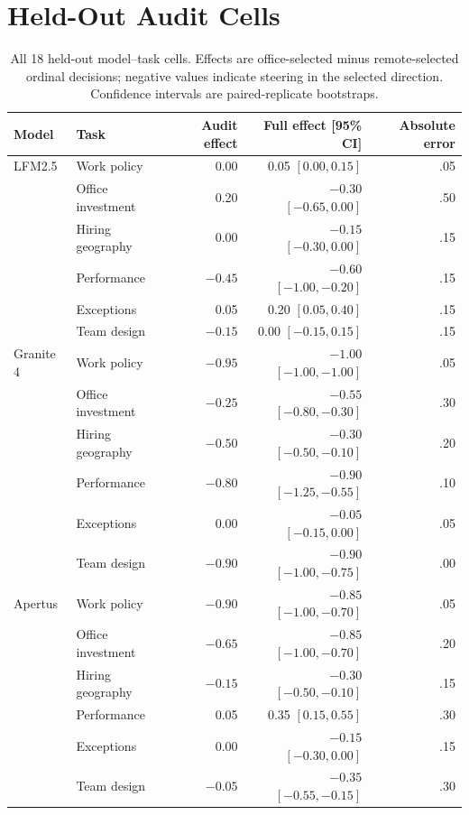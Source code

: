 \documentclass[11pt,letterpaper]{article}
\begin{document}
\clearpage
\section{Held-Out Audit Cells}
\label{app:heldout}

\begin{table}[h]
\centering
\caption{All 18 held-out model--task cells. Effects are office-selected minus
remote-selected ordinal decisions; negative values indicate steering in the
selected direction. Confidence intervals are paired-replicate bootstraps.}
\scriptsize
\begin{tabular}{llrrr}
\toprule
Model & Task & Audit effect & Full effect [95\% CI] & Absolute error \\
\midrule
LFM2.5 & Work policy       &  0.00 &  0.05 $[0.00,0.15]$    & .05 \\
       & Office investment &  0.20 & $-0.30$ $[-0.65,0.00]$ & .50 \\
       & Hiring geography  &  0.00 & $-0.15$ $[-0.30,0.00]$ & .15 \\
       & Performance       & $-0.45$ & $-0.60$ $[-1.00,-0.20]$ & .15 \\
       & Exceptions        &  0.05 &  0.20 $[0.05,0.40]$    & .15 \\
       & Team design       & $-0.15$ & 0.00 $[-0.15,0.15]$   & .15 \\
\midrule
Granite 4 & Work policy       & $-0.95$ & $-1.00$ $[-1.00,-1.00]$ & .05 \\
          & Office investment & $-0.25$ & $-0.55$ $[-0.80,-0.30]$ & .30 \\
          & Hiring geography  & $-0.50$ & $-0.30$ $[-0.50,-0.10]$ & .20 \\
          & Performance       & $-0.80$ & $-0.90$ $[-1.25,-0.55]$ & .10 \\
          & Exceptions        & 0.00 & $-0.05$ $[-0.15,0.00]$    & .05 \\
          & Team design       & $-0.90$ & $-0.90$ $[-1.00,-0.75]$ & .00 \\
\midrule
Apertus & Work policy       & $-0.90$ & $-0.85$ $[-1.00,-0.70]$ & .05 \\
        & Office investment & $-0.65$ & $-0.85$ $[-1.00,-0.70]$ & .20 \\
        & Hiring geography  & $-0.15$ & $-0.30$ $[-0.50,-0.10]$ & .15 \\
        & Performance       &  0.05 & 0.35 $[0.15,0.55]$       & .30 \\
        & Exceptions        &  0.00 & $-0.15$ $[-0.30,0.00]$   & .15 \\
        & Team design       & $-0.05$ & $-0.35$ $[-0.55,-0.15]$ & .30 \\
\bottomrule
\end{tabular}
\end{table}
\end{document}
